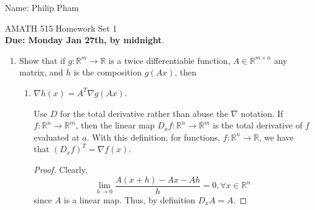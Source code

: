 \documentclass[11pt]{amsart}
\begin{document}
{\Large Name: Philip Pham}  \\
\begin{center}
\Large AMATH 515 \hskip 2in Homework Set 1\\
{\bf Due:  Monday Jan 27th, by midnight}. 
\end{center}
\bigskip
\begin{enumerate}

%
%
%

\item Show that if $g:\mathbb{R}^m \rightarrow \mathbb{R}$ is a twice differentiable function,  $A \in \mathbb{R}^{m\times n}$ any matrix, 
and $h$ is the composition $g(Ax)$, then  
\begin{enumerate}
\item $\nabla h(x) = A^T \nabla g(Ax)$.

  Use $D$ for the total derivative rather than abuse the $\nabla$ notation. If
  $f: \mathbb{R}^n \rightarrow \mathbb{R}^m$, then the linear map
  $D_a f: \mathbb{R}^n \rightarrow \mathbb{R}^m$ is the total derivative of $f$
  evaluated at $a$. With this definition, for functions,
  $f: \mathbb{R}^n \rightarrow \mathbb{R}$, we have that
  $\left(D_x f\right)^T = \nabla f (x)$.
  
  \begin{proof}
    
    Clearly, \begin{equation*}
      \lim_{h \rightarrow 0} \frac{A(x + h) - Ax - Ah}{h} = 0, \forall x \in \mathbb{R}^n
    \end{equation*}
    since $A$ is a linear map. Thus, by definition $D_x A = A$.


\end{proof}
\end{enumerate}
\end{enumerate}
\end{document}
